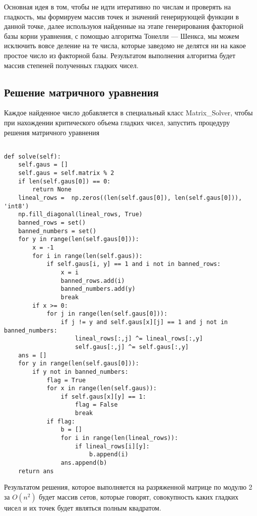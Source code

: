 Основная идея в том, чтобы не идти итеративно по числам и проверять на гладкость, мы формируем массив точек и значений генерирующей функции в данной точке, далее используюя найденные на этапе генерирования факторной базы корни уравнения, с помощью алгоритма Тонелли — Шенкса, мы можем исключить вовсе деление на те числа, которые заведомо не делятся ни на какое простое число из факторной базы. Результатом выполнения алгоритма будет массив степеней полученных гладких чисел.


\subsection{Решение матричного уравнения}

Каждое найденное число добавляется в специальный класс Matrix\_Solver, чтобы при нахождении критического объема гладких чисел, запустить процедуру решения матричного уравнения

\begin{lstlisting}

def solve(self):
    self.gaus = []
    self.gaus = self.matrix % 2
    if len(self.gaus[0]) == 0:
        return None
    lineal_rows =  np.zeros((len(self.gaus[0]), len(self.gaus[0])), 'int8')
    np.fill_diagonal(lineal_rows, True)
    banned_rows = set()
    banned_numbers = set()
    for y in range(len(self.gaus[0])):
        x = -1
        for i in range(len(self.gaus)):
            if self.gaus[i, y] == 1 and i not in banned_rows:
                x = i
                banned_rows.add(i)
                banned_numbers.add(y)
                break
        if x >= 0:
            for j in range(len(self.gaus[0])):
                if j != y and self.gaus[x][j] == 1 and j not in banned_numbers:
                    lineal_rows[:,j] ^= lineal_rows[:,y]
                    self.gaus[:,j] ^= self.gaus[:,y]
    ans = []
    for y in range(len(self.gaus[0])):
        if y not in banned_numbers:
            flag = True
            for x in range(len(self.gaus)):
                if self.gaus[x][y] == 1:
                    flag = False
                    break
            if flag:
                b = []
                for i in range(len(lineal_rows)):
                    if lineal_rows[i][y]:
                        b.append(i)
                ans.append(b)
    return ans
\end{lstlisting}

Результатом решения, которое выполняется на разряженной матрице по модулю 2 за $O(n^2)$ будет массив сетов, которые говорят, совокупность каких гладких чисел и их точек будет являться полным квадратом.

